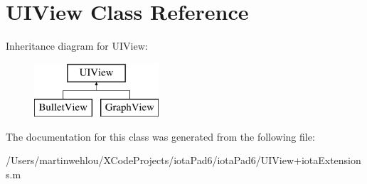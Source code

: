 \hypertarget{class_u_i_view}{
\section{UIView Class Reference}
\label{class_u_i_view}
}
Inheritance diagram for UIView:\begin{figure}[H]
\begin{center}
\leavevmode
\includegraphics[height=2.000000cm]{class_u_i_view}
\end{center}
\end{figure}


The documentation for this class was generated from the following file:\begin{DoxyCompactItemize}
\item 
/Users/martinwehlou/XCodeProjects/iotaPad6/iotaPad6/UIView+iotaExtensions.m\end{DoxyCompactItemize}
